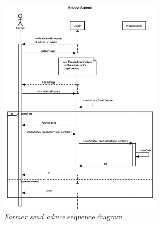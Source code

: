 \begin{enumerate}
\begin{figure}[H]
\begin{center}
        \includegraphics[width=0.7\textwidth]{sequence/AdviceSubmit.png}
        \caption{\emph{Farmer send advice} sequence diagram}
        \label{fig:sequence7}
        \end{center}
    \end{figure}


\end{enumerate}
